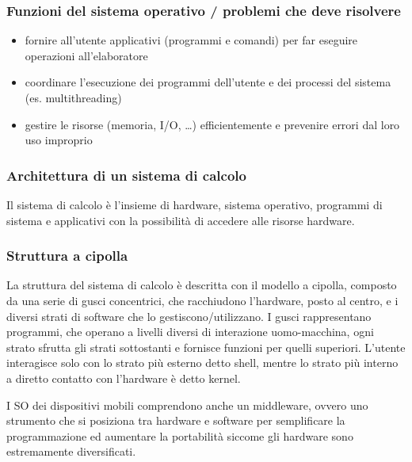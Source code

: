 \documentclass[a4paper]{article}
\begin{document}
\subsubsection*{Funzioni del sistema operativo / problemi che deve risolvere}
\begin{itemize}
	\item fornire all'utente applicativi (programmi e comandi) per far eseguire operazioni all'elaboratore
	\item coordinare l'esecuzione dei programmi dell'utente e dei processi del sistema (es. multithreading)
	\item gestire le risorse (memoria, I/O, \dots) efficientemente e prevenire errori dal loro uso improprio
\end{itemize}

\subsubsection*{Architettura di un sistema di calcolo}
Il sistema di calcolo è l'insieme di hardware, sistema operativo, programmi di sistema e applicativi con la possibilità di
accedere alle risorse hardware. 

\subsubsection*{Struttura a cipolla}
La struttura del sistema di calcolo è descritta con il modello a cipolla, composto da una serie di gusci concentrici, che
racchiudono l’hardware, posto al centro, e i diversi strati di software che lo gestiscono/utilizzano. I gusci rappresentano
programmi, che operano a livelli diversi di interazione uomo-macchina, ogni strato sfrutta gli strati sottostanti e fornisce
funzioni per quelli superiori. L'utente interagisce solo con lo strato più esterno detto shell, mentre lo strato più
interno a diretto contatto con l'hardware è detto kernel.

I SO dei dispositivi mobili comprendono anche un middleware, ovvero uno strumento che si posiziona tra hardware e software per
semplificare la programmazione ed aumentare la portabilità siccome gli hardware sono estremamente diversificati.


\end{document}
